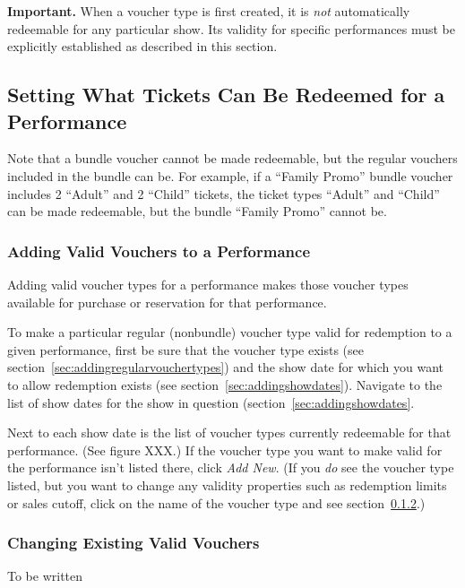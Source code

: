 \textbf{Important.} When a voucher type is first created, it is
\emph{not} automatically redeemable for any particular show.  Its
validity for specific performances must be explicitly established as
described in this section.

\subsection{Setting What Tickets Can Be Redeemed for a Performance}
\label{sec:validvouchers}

Note that a bundle voucher cannot be made redeemable, but the regular
vouchers included in the bundle can be.  For example, if a ``Family
Promo'' bundle voucher includes 2 ``Adult'' and 2 ``Child'' tickets, the
ticket types ``Adult'' and ``Child'' can be made redeemable, but the
bundle ``Family Promo'' cannot be.

\subsubsection{Adding Valid Vouchers to a Performance}
\label{sec:addingvalidvouchers}

Adding valid voucher types for a performance makes those voucher types
available for purchase or reservation for that performance.

To make a particular regular (nonbundle) voucher type valid for
redemption to a given performance, first be sure that the voucher type
exists (see section~\ref{sec:addingregularvouchertypes}) and the show
date for which you want to allow redemption exists (see
section~\ref{sec:addingshowdates}).  Navigate to the list of show dates
for the show in question (section~\ref{sec:addingshowdates}.

Next to each show date is the list of voucher types currently redeemable
for that performance.  (See figure XXX.)  If the voucher type you want
to make valid for the performance isn't listed there, click \emph{Add
  New}.  (If you \emph{do} see the voucher type listed, but you want to
change any validity properties such as redemption limits or sales
cutoff, click on the name of the voucher type and see
section~\ref{sec:changingvalidvoucher}.) 


\subsubsection{Changing Existing Valid Vouchers}
\label{sec:changingvalidvoucher}

To be written
